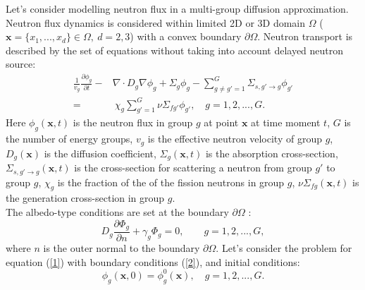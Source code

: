 \documentclass{llncs}
\begin{document}
Let's consider modelling neutron flux in a multi-group diffusion approximation. Neutron flux dynamics is considered within limited 2D or 3D domain  $\Omega$ ($\bm x = \{x_1, ..., x_d\} \in \Omega, \ d = 2,3$) with a convex boundary $\partial \Omega$. Neutron transport is described by the set of equations without taking into account delayed neutron source:
 \begin{equation}\label{1}
\begin{split}
 \frac{1}{v_g} \frac{\partial \phi_g}{\partial t} - & \nabla \cdot D_g \nabla \phi_g + \Sigma_g \phi_g 
 - \sum_{g\neq g'=1}^{G} \Sigma_{s,g'\rightarrow g} \phi_{g'} \\
 =  & \ \chi_g \sum_{g'=1}^{G} \nu \Sigma_{fg'} \phi_{g'} , \quad 
 g = 1,2, ..., G .
\end{split}
\end{equation} 
Here $\phi_g(\bm x,t)$ is the neutron flux in group $g$ at point $\bm x$ at time moment $t$,
$G$ is the number of energy groups,
$v_g$ is the effective neutron velocity of group $g$,
$D_g(\bm x)$ is the diffusion coefficient, $\Sigma_g(\bm x,t)$ is the absorption cross-section,
$\Sigma_{s,g'\rightarrow g}(\bm x,t)$ is the cross-section for scattering a neutron from group $g'$ to group $g$,
 $\chi_g$  is the fraction of the of the fission neutrons in group $g$, 
$\nu\Sigma_{fg}(\bm x,t)$ is the generation cross-section in group $g$.\\
The albedo-type conditions are set at the boundary $\partial \Omega$ :
\begin{equation}\label{2}
 D_g\frac{\partial \Phi_g}{\partial n} + \gamma_g \Phi_g = 0, \quad 
 \quad g = 1,2, ..., G ,
\end{equation}
where $n$ is the outer normal to the boundary $\partial \Omega$.
Let's consider the problem for equation (\ref{1}) with boundary conditions (\ref{2}), and initial conditions:
\begin{equation}\label{3}
 \phi_g(\bm x,0) = \phi_g^0(\bm x), 
  \quad  g = 1,2, ..., G .
\end{equation} 
\end{document}
